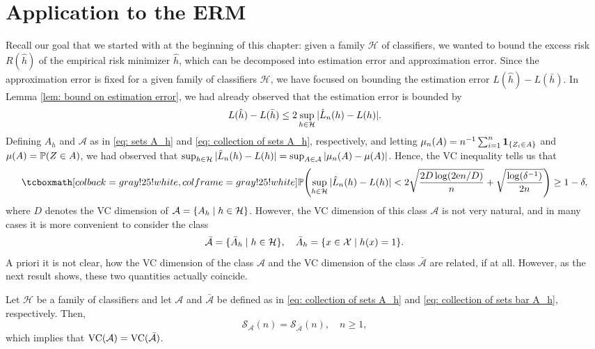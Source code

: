 \section{Application to the ERM}

Recall our goal that we started with at the beginning of this chapter: given a family $\mathcal{H}$ of classifiers, we wanted to bound the excess risk $R(\hat{h})$ of the empirical risk minimizer $\hat{h}$, which can be decomposed into estimation error and approximation error. Since the approximation error is fixed for a given family of classifiers $\mathcal{H}$, we have focused on bounding the estimation error $L(\hat{h}) - L(\bar{h})$. In Lemma \ref{lem: bound on estimation error}, we had already observed that the estimation error is bounded by
\[
    L(\hat{h}) - L(\bar{h}) \leq 2 \sup_{h \in \mathcal{H}} \abs*{\hat{L}_n(h) - L(h)}.
\]
Defining $A_h$ and $\mathcal{A}$ as in \eqref{eq: sets A_h} and \eqref{eq: collection of sets A_h}, respectively, and letting $\mu_n(A) = n^{-1} \sum_{i=1}^n \indSet{Z_i \in A}$ and $\mu(A) = \operatorname{\mathbb{P}}(Z \in A)$, we had observed that $\sup_{h \in \mathcal{H}} \abs*{\hat{L}_n(h) - L(h)} = \sup_{A \in \mathcal{A}} \abs{\mu_n(A) - \mu(A)}$. Hence, the VC inequality tells us that
\begin{equation}
\label{eq: VC ineqaulity for ERM}
    \highlightMath{
        \Prob\left(\sup_{h \in \mathcal{H}} \abs*{\hat{L}_n(h) - L(h)} < 2 \sqrt{\frac{2D \log(2 \e n / D)}{n}} + \sqrt{\frac{\log(\delta^{-1})}{2n}}\right) \geq 1 - \delta,
    }
\end{equation}
where $D$ denotes the VC dimension of $\mathcal{A} = \set{A_h \with h \in \mathcal{H}}$. However, the VC dimension of this class $\mathcal{A}$ is not very natural, and in many cases it is more convenient to consider the class
\begin{equation}
\label{eq: collection of sets bar A_h}
    \bar{\mathcal{A}} = \{\bar A_h \with h \in \mathcal{H}\}, \quad \bar A_h = \set{x \in \mathcal{X} \with h(x) = 1}.
\end{equation}
A priori it is not clear, how the VC dimension of the class $\mathcal{A}$ and the VC dimension of the class $\bar{\mathcal{A}}$ are related, if at all. However, as the next result shows, these two quantities actually coincide.

\begin{theorem}
Let $\mathcal{H}$ be a family of classifiers and let $\mathcal{A}$ and $\bar{\mathcal{A}}$ be defined as in \eqref{eq: collection of sets A_h} and \eqref{eq: collection of sets bar A_h}, respectively. Then,
\[
    \mathcal{S}_{\mathcal{A}}(n) = \mathcal{S}_{\bar{\mathcal{A}}}(n), \quad n \geq 1,
\]
which implies that $\operatorname{VC}(\mathcal{A}) = \operatorname{VC}(\bar{\mathcal{A}})$.
\end{theorem}

